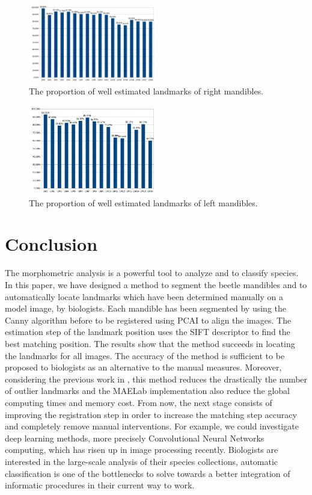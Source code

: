 \documentclass[twoside,twocolumn,10pt]{article}
\begin{document}
\begin{figure}[htbp]
    \centering
    \includegraphics[width=0.5\textwidth]{./images/md_chartlms}
    \caption{The proportion of well estimated landmarks of right mandibles.}
    \label{figmdresultlm}
\end{figure}
\begin{figure}[htbp]
    \centering
    \includegraphics[width=0.5\textwidth]{./images/mg_chartlms}
    \caption{The proportion of well estimated landmarks of left mandibles.}
    \label{figmgresultlm}
\end{figure}

\section{Conclusion}

The morphometric analysis is a powerful tool to analyze and to
classify species. In this paper, we have designed a method to segment
the beetle mandibles and to automatically locate landmarks which have
been determined manually on a model image, by biologists. Each
mandible has been segmented by using the Canny algorithm before to be
registered using PCAI to align the images. The estimation step of the
landmark position uses the SIFT descriptor to find the best matching
position.
The results show that the method succeeds in locating the landmarks for all images.
The accuracy of the method is sufficient to be proposed to biologists
as an alternative to the manual measures. Moreover, considering the previous work in
\cite{leestimating}, this method reduces the drastically the number of
outlier landmarks and the MAELab implementation also reduce the global
computing times and memory cost. From now, the next stage consists of
improving the registration step in order to increase the matching step
accuracy and completely remove manual interventions. For example, we
could investigate deep learning methods, more precisely Convolutional
Neural Networks computing,  which has risen up in
image processing recently. Biologists are interested in the large-scale
analysis of their species collections, automatic classification is one of the
bottlenecks to solve towards a better integration of informatic procedures in
their current way to work.






\end{document}
